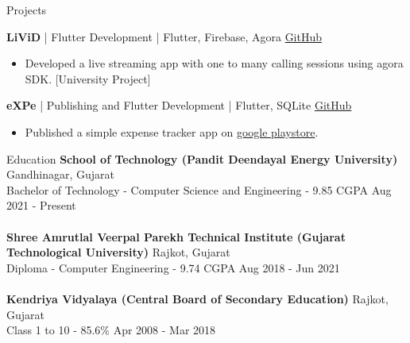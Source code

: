 \documentclass{resume}
\begin{document}
\begin{rSection}{Projects}
\item \textbf{LiViD} | {Flutter Development} | {Flutter, Firebase, Agora} \hfill \href{https://github.com/JayNakum/LiViD}{GitHub}
\begin{itemize}
     \item Developed a live streaming app with one to many calling sessions using agora SDK. [University Project]
 \end{itemize}

\item \textbf{eXPe} | {Publishing and Flutter Development} | {Flutter, SQLite} \hfill \href{https://github.com/JayNakum/eXPe}{GitHub}
\begin{itemize}
     \item Published a simple expense tracker app on \href{https://play.google.com/store/apps/details?id=io.github.jaynakum.expe&pcampaignid=pcampaignidMKT-Other-global-all-co-prtnr-py-PartBadge-Mar2515-1}{google playstore}.\\
 \end{itemize}
\end{rSection}

\begin{rSection}{Education}
{\bf School of Technology (Pandit Deendayal Energy University)} \hfill {Gandhinagar, Gujarat}\\
Bachelor of Technology - Computer Science and Engineering - 9.85 CGPA \hfill {Aug 2021 - Present}\\
\\
{\bf Shree Amrutlal Veerpal Parekh Technical Institute (Gujarat Technological University)} \hfill {Rajkot, Gujarat}\\
Diploma - Computer Engineering - 9.74 CGPA \hfill {Aug 2018 - Jun 2021}\\
\\
{\bf Kendriya Vidyalaya (Central Board of Secondary Education)} \hfill {Rajkot, Gujarat}\\
Class 1 to 10 - 85.6\% \hfill {Apr 2008 - Mar 2018}
\end{rSection}
\end{document}
